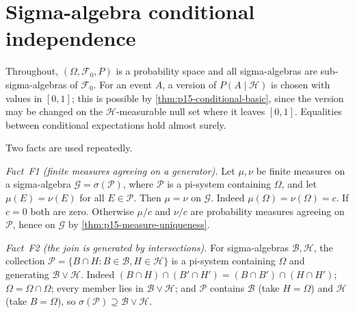 \section{Sigma-algebra conditional independence}
\label{sec:annex-p15-w02c-p15-009-sigma-ci}

Throughout, \((\Omega,\mathcal F_0,P)\) is a probability space and all
sigma-algebras are sub-sigma-algebras of \(\mathcal F_0\). For an event
\(A\), a version of \(P(A\mid\mathcal H)\) is chosen with values in
\([0,1]\); this is possible by \cref{thm:p15-conditional-basic}, since
the version may be changed on the \(\mathcal H\)-measurable null set where
it leaves \([0,1]\). Equalities between conditional expectations hold
almost surely.

Two facts are used repeatedly.

\emph{Fact~F1 (finite measures agreeing on a generator).} Let \(\mu,\nu\)
be finite measures on a sigma-algebra \(\mathcal G=\sigma(\mathcal P)\),
where \(\mathcal P\) is a pi-system containing \(\Omega\), and let
\(\mu(E)=\nu(E)\) for all \(E\in\mathcal P\). Then \(\mu=\nu\) on
\(\mathcal G\). Indeed \(\mu(\Omega)=\nu(\Omega)=c\). If \(c=0\) both are
zero. Otherwise \(\mu/c\) and \(\nu/c\) are probability measures agreeing on
\(\mathcal P\), hence on \(\mathcal G\) by \cref{thm:p15-measure-uniqueness}.

\emph{Fact~F2 (the join is generated by intersections).} For
sigma-algebras \(\mathcal B,\mathcal H\), the collection
\(\mathcal P=\{B\cap H:B\in\mathcal B,H\in\mathcal H\}\) is a pi-system
containing \(\Omega\) and generating \(\mathcal B\vee\mathcal H\).
Indeed \((B\cap H)\cap(B'\cap H')=(B\cap B')\cap(H\cap H')\);
\(\Omega=\Omega\cap\Omega\); every member lies in \(\mathcal B\vee\mathcal H\);
and \(\mathcal P\) contains \(\mathcal B\) (take \(H=\Omega\)) and
\(\mathcal H\) (take \(B=\Omega\)), so \(\sigma(\mathcal P)\supseteq\mathcal B\vee\mathcal H\).

